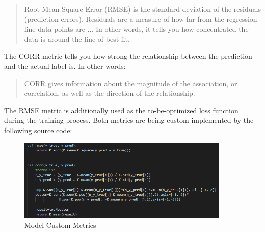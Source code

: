 \begin{quote}
    Root Mean Square Error (RMSE) is the standard deviation of the residuals (prediction errors). Residuals are a measure of how far from the regression line data points are ... In other words, it tells you how concentrated the data is around the line of best fit. \citep[~para. 1]{2020:RMSE}
\end{quote}

The CORR metric tells you how strong the relationship between the prediction and the actual label is. In other words:

\begin{quote}
    CORR gives information about the magnitude of the association, or correlation, as well as the direction of the relationship. \citep[~para. 1]{2020:PearsonCorrelation}
\end{quote}

The RMSE metric is additionally used as the to-be-optimized loss function during the training process. Both metrics are being custom implemented by the following source code:

\begin{figure}[H]
  \begin{center}
  \includegraphics[angle=0, width=0.9\textwidth]{Figures/model_metrics.PNG}
  \caption{Model Custom Metrics}
  \label{fig:ModelCustomMetrics}
  \end{center}
\end{figure}



